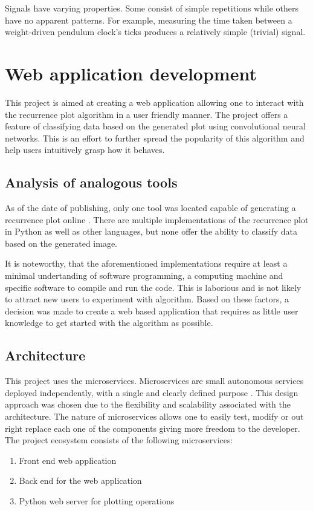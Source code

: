 \documentclass[a4paper,12pt,fleqn]{article}
\begin{document}
Signals have varying properties. Some consist of simple repetitions while others
have no apparent patterns.
For example, measuring the time taken between a weight-driven
pendulum clock's ticks produces a relatively simple (trivial) signal.


\newpage
\section{Web application development}
This project is aimed at creating a web application allowing one to interact with the recurrence plot algorithm in a user friendly manner.
The project offers a feature of classifying data based on the generated plot using convolutional neural networks.
This is an effort to further spread the popularity of this algorithm and help users intuitively grasp how it behaves.


\subsection{Analysis of analogous tools}
As of the date of publishing, only one tool was located capable 
of generating a recurrence plot online \cite{recurrence_plot_tk}. 
There are multiple implementations of the recurrence plot in Python as well as other
languages, but none offer the ability to classify data based on the generated image.

It is noteworthy, that the aforementioned implementations require at least a minimal undertanding of software programming, a computing machine and specific software to compile and run the code. 
This is laborious and is not likely to attract new users to experiment with algorithm.
Based on these factors, a decision was made to create a web based application that requires
as little user knowledge to get started with the algorithm as possible.


\subsection{Architecture}
This project uses the microservices. 
Microservices are small autonomous services deployed independently, with a single and clearly defined purpose \cite{krause2015microservices}. This design approach was chosen due to the flexibility and scalability associated with the architecture. %
The nature of microservices allows one to easily test, modify or out right replace each one of the components giving more freedom to the developer.
The project ecosystem consists of the following microservices:
\begin{enumerate}
	\item Front end web application
	\item Back end for the web application
	\item Python web server for plotting operations
\end{enumerate}
\end{document}

